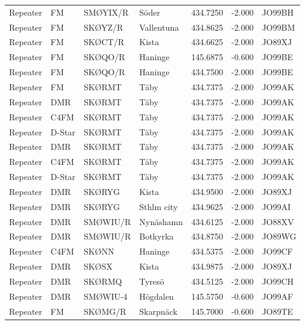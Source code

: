\begin{longtable}{llllrrl}
	Repeater & FM         & SMØYIX/R & Söder           &   434.7250 &   -2.000 & JO99BH \\
	Repeater & FM         & SKØYZ/R  & Vallentuna      &   434.8625 &   -2.000 & JO99BM \\
	Repeater & FM         & SKØCT/R  & Kista           &   434.6625 &   -2.000 & JO89XJ \\
	Repeater & FM         & SKØQO/R  & Haninge         &   145.6875 &   -0.600 & JO99BE \\
	Repeater & FM         & SKØQO/R  & Haninge         &   434.7500 &   -2.000 & JO99BE \\
	Repeater & FM         & SKØRMT   & Täby            &   434.7375 &   -2.000 & JO99AK \\
	Repeater & DMR        & SKØRMT   & Täby            &   434.7375 &   -2.000 & JO99AK \\
	Repeater & C4FM       & SKØRMT   & Täby            &   434.7375 &   -2.000 & JO99AK \\
	Repeater & D-Star     & SKØRMT   & Täby            &   434.7375 &   -2.000 & JO99AK \\
	Repeater & DMR        & SKØRMT   & Täby            &   434.7375 &   -2.000 & JO99AK \\
	Repeater & C4FM       & SKØRMT   & Täby            &   434.7375 &   -2.000 & JO99AK \\
	Repeater & D-Star     & SKØRMT   & Täby            &   434.7375 &   -2.000 & JO99AK \\
	Repeater & DMR        & SKØRYG   & Kista           &   434.9500 &   -2.000 & JO89XJ \\
	Repeater & DMR        & SKØRYG   & Sthlm city      &   434.9625 &   -2.000 & JO99AI \\
	Repeater & DMR        & SMØWIU/R & Nynäshamn       &   434.6125 &   -2.000 & JO88XV \\
	Repeater & DMR        & SMØWIU/R & Botkyrka        &   434.8750 &   -2.000 & JO89WG \\
	Repeater & C4FM       & SKØNN    & Haninge         &   434.5375 &   -2.000 & JO99CF \\
	Repeater & DMR        & SKØSX    & Kista           &   434.9875 &   -2.000 & JO89XJ \\
	Repeater & DMR        & SKØRMQ   & Tyresö          &   434.5125 &   -2.000 & JO99CH \\
	Repeater & DMR        & SMØWIU-4 & Högdalen        &   145.5750 &   -0.600 & JO99AF \\
	Repeater & FM         & SKØMG/R  & Skarpnäck       &   145.7000 &   -0.600 & JO89TE \\

\end{longtable}
